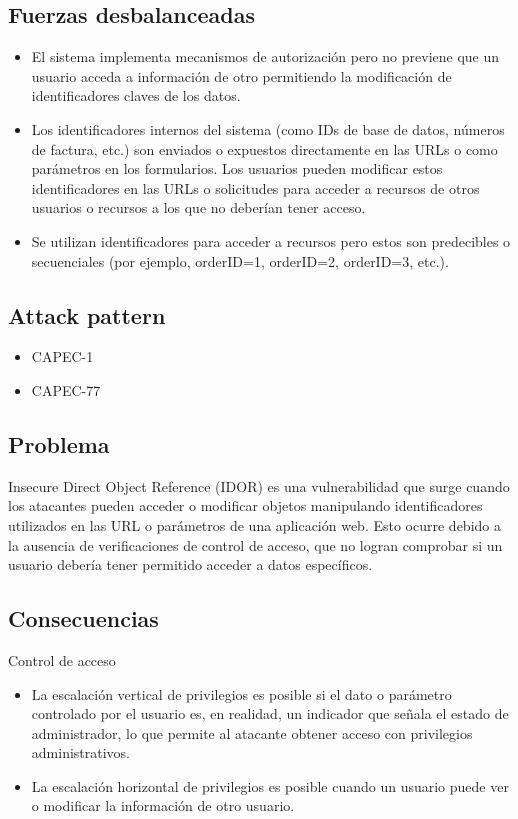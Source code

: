 \subsection{Fuerzas desbalanceadas}
\begin{itemize}
    \item El sistema implementa mecanismos de autorización pero no previene que un usuario acceda a información de otro permitiendo la modificación de identificadores claves de los datos. 
    \item Los identificadores internos del sistema (como IDs de base de datos, números de factura, etc.) son enviados o expuestos directamente en las URLs o como parámetros en los formularios. Los usuarios pueden modificar estos identificadores en las URLs o solicitudes para acceder a recursos de otros usuarios o recursos a los que no deberían tener acceso.
    \item Se utilizan identificadores para acceder a recursos pero estos son predecibles o secuenciales (por ejemplo, orderID=1, orderID=2, orderID=3, etc.). 
\end{itemize}
\subsection{Attack pattern}
\begin{itemize}
    \item CAPEC-1
    \item CAPEC-77
\end{itemize}

\subsection{Problema}
Insecure Direct Object Reference (IDOR) es una vulnerabilidad que surge cuando los atacantes pueden acceder o modificar objetos manipulando identificadores utilizados en las URL o parámetros de una aplicación web. Esto ocurre debido a la ausencia de verificaciones de control de acceso, que no logran comprobar si un usuario debería tener permitido acceder a datos específicos.

\subsection{Consecuencias}
Control de acceso
\begin{itemize}
    \item  La escalación vertical de privilegios es posible si el dato o parámetro controlado por el usuario es, en realidad, un indicador que señala el estado de administrador, lo que permite al atacante obtener acceso con privilegios administrativos.
    \item La escalación horizontal de privilegios es posible cuando un usuario puede ver o modificar la información de otro usuario.
\end{itemize}


